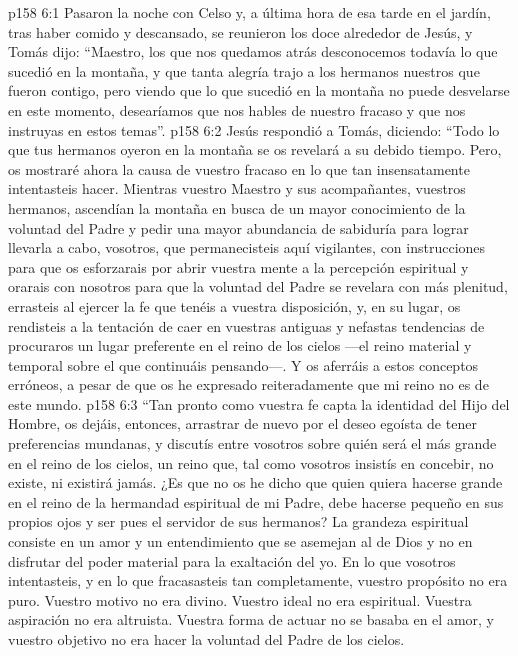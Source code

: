 \vs p158 6:1 Pasaron la noche con Celso y, a última hora de esa tarde en el jardín, tras haber comido y descansado, se reunieron los doce alrededor de Jesús, y Tomás dijo: “Maestro, los que nos quedamos atrás desconocemos todavía lo que sucedió en la montaña, y que tanta alegría trajo a los hermanos nuestros que fueron contigo, pero viendo que lo que sucedió en la montaña no puede desvelarse en este momento, desearíamos que nos hables de nuestro fracaso y que nos instruyas en estos temas”.
\vs p158 6:2 Jesús respondió a Tomás, diciendo: “Todo lo que tus hermanos oyeron en la montaña se os revelará a su debido tiempo. Pero, os mostraré ahora la causa de vuestro fracaso en lo que tan insensatamente intentasteis hacer. Mientras vuestro Maestro y sus acompañantes, vuestros hermanos, ascendían la montaña en busca de un mayor conocimiento de la voluntad del Padre y pedir una mayor abundancia de sabiduría para lograr llevarla a cabo, vosotros, que permanecisteis aquí vigilantes, con instrucciones para que os esforzarais por abrir vuestra mente a la percepción espiritual y orarais con nosotros para que la voluntad del Padre se revelara con más plenitud, errasteis al ejercer la fe que tenéis a vuestra disposición, y, en su lugar, os rendisteis a la tentación de caer en vuestras antiguas y nefastas tendencias de procuraros un lugar preferente en el reino de los cielos ---el reino material y temporal sobre el que continuáis pensando---. Y os aferráis a estos conceptos erróneos, a pesar de que os he expresado reiteradamente que mi reino no es de este mundo.
\vs p158 6:3 “Tan pronto como vuestra fe capta la identidad del Hijo del Hombre, os dejáis, entonces, arrastrar de nuevo por el deseo egoísta de tener preferencias mundanas, y discutís entre vosotros sobre quién será el más grande en el reino de los cielos, un reino que, tal como vosotros insistís en concebir, no existe, ni existirá jamás. ¿Es que no os he dicho que quien quiera hacerse grande en el reino de la hermandad espiritual de mi Padre, debe hacerse pequeño en sus propios ojos y ser pues el servidor de sus hermanos? La grandeza espiritual consiste en un amor y un entendimiento que se asemejan al de Dios y no en disfrutar del poder material para la exaltación del yo. En lo que vosotros intentasteis, y en lo que fracasasteis tan completamente, vuestro propósito no era puro. Vuestro motivo no era divino. Vuestro ideal no era espiritual. Vuestra aspiración no era altruista. Vuestra forma de actuar no se basaba en el amor, y vuestro objetivo no era hacer la voluntad del Padre de los cielos.
